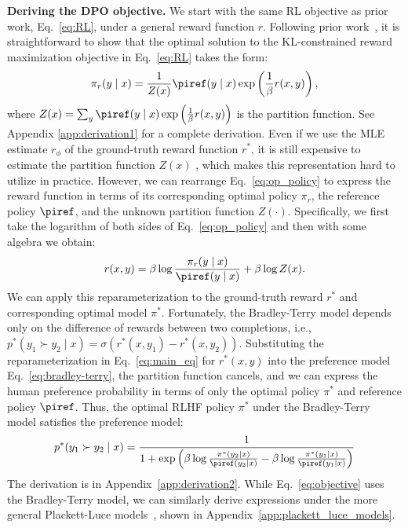 \textbf{Deriving the DPO objective.} We start with the same RL objective as prior work, Eq.~\ref{eq:RL}, under a general reward function $r$. Following prior work~\citep{peters2007reinforcement, peng2019advantage, korbak2022reinforcement, go2023aligning}, it is straightforward to show that the optimal solution to the KL-constrained reward maximization objective in Eq.~\ref{eq:RL} takes the form:
\begin{equation}\label{eq:op_policy}
    \pi_r(y\mid x) = \frac{1}{Z(x)}\piref(y\mid x)\exp\left(\frac{1}{\beta}r(x, y)\right),
\end{equation}
where $Z(x) =\sum_{y}\piref(y\mid x)\exp\left(\frac{1}{\beta}r(x, y)\right)$ is the partition function. See Appendix \ref{app:derivation1} for a complete derivation. Even if we use the MLE estimate $r_{\phi}$ of the ground-truth reward function $r^*$, it is still expensive to estimate the partition function $Z(x)$ \citep{korbak2022reinforcement, go2023aligning}, which makes this representation hard to utilize in practice. However, we can rearrange Eq.~\ref{eq:op_policy} to express the reward function in terms of its corresponding optimal policy $\pi_r$, the reference policy $\piref$, and the unknown partition function $Z(\cdot)$. Specifically, we first take the logarithm of both sides of Eq.~\ref{eq:op_policy} and then with some algebra we obtain:
\begin{equation}\label{eq:main_eq}
    r(x,y) =\beta \log \frac{\pi_r(y\mid x)}{\piref(y\mid x)} + \beta \log Z(x).
\end{equation}
We can apply this reparameterization to the ground-truth reward $r^*$ and corresponding optimal model $\pi^*$. Fortunately, the Bradley-Terry model depends only on the difference of rewards between two completions, i.e., ${p^*(y_1 \succ y_2 \mid x) = \sigma(r^*(x, y_1) - r^*(x, y_2))}$. Substituting the reparameterization in Eq.~\ref{eq:main_eq} for $r^*(x,y)$ into the preference model Eq.~\ref{eq:bradley-terry}, the partition function cancels, and we can express the human preference probability in terms of only the optimal policy $\pi^*$ and reference policy $\piref$. Thus, the optimal RLHF policy $\pi^*$ under the Bradley-Terry model satisfies the preference model:
\begin{equation}\label{eq:objective}
    p^*(y_1\succ y_2 \mid x)=\frac{1}{1 + \exp\left(\beta \log \frac{\pi^*(y_2\mid x)}{\piref(y_2\mid x)} - \beta \log \frac{\pi^*(y_1\mid x)}{\piref(y_1\mid x)}\right)}
\end{equation}
The derivation is in Appendix~\ref{app:derivation2}. While Eq.~\ref{eq:objective} uses the Bradley-Terry model, we can similarly derive expressions under the more general Plackett-Luce models~\citep{plackett1975analysis, luce2012individual}, shown in Appendix~\ref{app:plackett_luce_models}.

